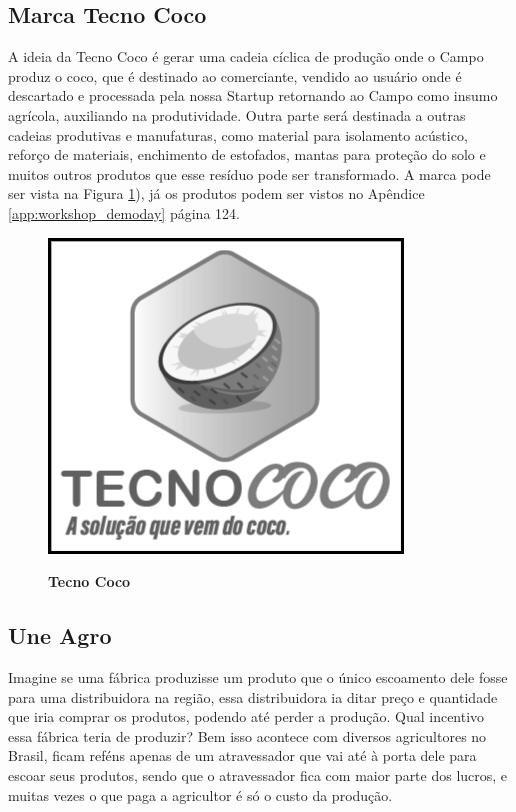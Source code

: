 \subsection{Marca Tecno Coco}

A ideia da Tecno Coco é gerar uma cadeia cíclica de produção onde o Campo produz o coco, que é destinado ao comerciante, vendido ao usuário onde é descartado e processada pela nossa Startup retornando ao Campo como insumo agrícola, auxiliando na produtividade. Outra parte será destinada a outras cadeias produtivas e manufaturas, como material para isolamento acústico, reforço de materiais, enchimento de estofados, mantas para proteção do solo e muitos outros produtos que esse resíduo pode ser transformado. A marca pode ser vista na Figura \ref{figura_50}), já os produtos podem ser vistos no Apêndice \ref{app:workshop_demoday} página 124.


\begin{figure}[H]
\centering
\caption{\textbf{Tecno Coco}}
\includegraphics[scale=0.45]{Imagens/tecnococo.png}
\label{figura_50}
\end{figure}


\subsection{Une Agro}

Imagine se uma fábrica produzisse um produto que o único escoamento dele fosse para uma distribuidora na região, essa distribuidora ia ditar preço e quantidade que iria comprar os produtos, podendo até perder a produção. Qual incentivo essa fábrica teria de produzir? Bem isso acontece com diversos agricultores no Brasil, ficam reféns apenas de um atravessador que vai até à porta dele para escoar seus produtos, sendo que o atravessador fica com maior parte dos lucros, e muitas vezes o que paga a agricultor é só o custo da produção.

